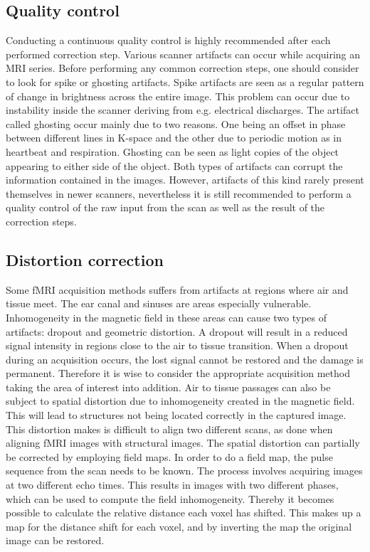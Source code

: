 \subsection{Quality control}
Conducting a continuous quality control is highly recommended after each performed correction step. Various scanner artifacts can occur while acquiring an MRI series. Before performing any common correction steps, one should consider to look for spike or ghosting artifacts. Spike artifacts are seen as a regular pattern of change in brightness across the entire image. This problem can occur due to instability inside the scanner deriving from e.g. electrical discharges.  
The artifact called ghosting occur mainly due to two reasons. One being an offset in phase between different lines in K-space and the other due to periodic motion as in heartbeat and respiration. Ghosting can be seen as light copies of the object appearing to either side of the object. Both types of artifacts can corrupt the information contained in the images. However, artifacts of this kind rarely present themselves in newer scanners, nevertheless it is still recommended to perform a quality control of the raw input from the scan as well as the result of the correction steps. \cite{Poldrack2011}

\subsection{Distortion correction}

Some fMRI acquisition methods suffers from artifacts at regions where air and tissue meet. The ear canal and sinuses are areas especially vulnerable. Inhomogeneity in the magnetic field in these areas can cause two types of artifacts: dropout and geometric distortion. A dropout will result in a reduced signal intensity in regions close to the air to tissue transition. When a dropout during an acquisition occurs, the lost signal cannot be restored and the damage is permanent. Therefore it is wise to consider the appropriate acquisition method taking the area of interest into addition. Air to tissue passages can also be subject to spatial distortion due to inhomogeneity created in the magnetic field. This will lead to structures not being located correctly in the captured image. This distortion makes is difficult to align two different scans, as done when aligning fMRI images with structural images. 
The spatial distortion can partially be corrected by employing field maps. In order to do a field map, the pulse sequence from the scan needs to be known. The process involves acquiring images at two different echo times. This results in images with two different phases, which can be used to compute the field inhomogeneity. Thereby it becomes possible to calculate the relative distance each voxel has shifted. This makes up a map for the distance shift for each voxel, and by inverting the map the original image can be restored. \cite{Poldrack2011}  


